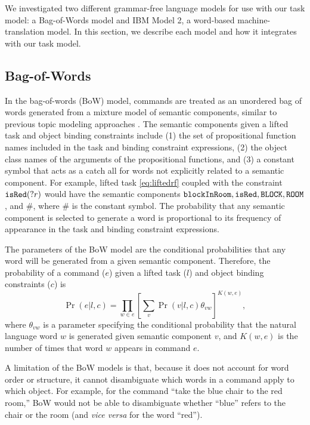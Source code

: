 \documentclass[conference]{IEEEtran}
\begin{document}
We investigated two different grammar-free language models for use with our task model: a Bag-of-Words model and IBM Model 2, a word-based machine-translation model. In this section, we describe each model and how it integrates with our task model.

\subsection{Bag-of-Words}
In the bag-of-words (BoW) model, commands are treated as an unordered bag of words generated from a mixture model of semantic components, similar to previous topic modeling approaches \cite{McCallum:1999vn}. The semantic components given a lifted task and object binding constraints include (1) the set of propositional function names included in the task and binding constraint expressions, (2) the object class names of the arguments of the propositional functions, and (3) a constant symbol that acts as a catch all for words not explicitly related to a semantic component. For example, lifted task \ref{eq:liftedrf} coupled with the constraint ${\tt isRed}(?r)$ would have the semantic components ${\tt blockInRoom}, {\tt isRed}, {\tt BLOCK}, {\tt ROOM}$, and $\#$, where $\#$ is the constant symbol. The probability that any semantic component is selected to generate a word is proportional to its frequency of appearance in the task and binding constraint expressions.

The parameters of the BoW model are the conditional probabilities that any word will be generated from a given semantic component. Therefore, the probability of a command ($e$) given a lifted task ($l$) and object binding constraints ($c$) is
\begin{equation}
\Pr(e | l, c)  = \prod_{w \in e} \left[ \sum_v \Pr(v | l, c) \theta_{vw} \right]^{K(w, e)},
\end{equation}
where $\theta_{vw}$ is a parameter specifying the conditional probability that the natural language word $w$ is generated given semantic component $v$, and $K(w, e)$ is the number of times that word $w$ appears in command $e$.

A limitation of the BoW models is that, because it does not account for word order or structure, it cannot disambiguate which words in a command apply to which object. For example, for the command ``take the blue chair to the red room,'' BoW would not be able to disambiguate whether ``blue'' refers to the chair or the room (and {\em vice versa} for the word ``red'').
\end{document}
